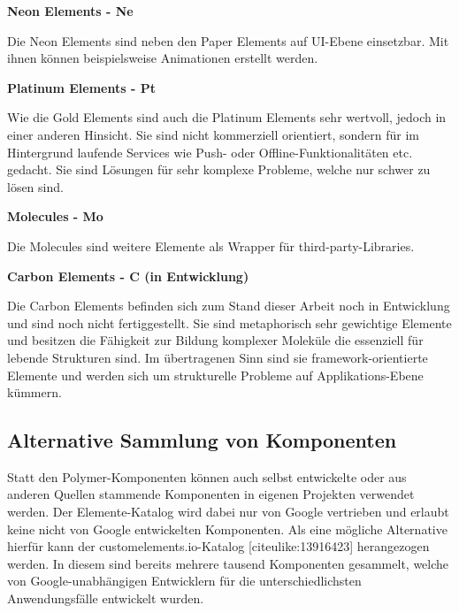 \textbf{Neon Elements - Ne}

Die Neon Elements sind neben den Paper Elements auf UI-Ebene einsetzbar.
Mit ihnen können beispielsweise Animationen erstellt werden.

\textbf{Platinum Elements - Pt}

Wie die Gold Elements sind auch die Platinum Elements sehr wertvoll,
jedoch in einer anderen Hinsicht. Sie sind nicht kommerziell orientiert,
sondern für im Hintergrund laufende Services wie Push- oder
Offline-Funktionalitäten etc. gedacht. Sie sind Lösungen für sehr
komplexe Probleme, welche nur schwer zu lösen sind.

\textbf{Molecules - Mo}

Die Molecules sind weitere Elemente als Wrapper für
third-party-Libraries.

\textbf{Carbon Elements - C (in Entwicklung)}

Die Carbon Elements befinden sich zum Stand dieser Arbeit noch in
Entwicklung und sind noch nicht fertiggestellt. Sie sind metaphorisch
sehr gewichtige Elemente und besitzen die Fähigkeit zur Bildung
komplexer Moleküle die essenziell für lebende Strukturen sind. Im
übertragenen Sinn sind sie framework-orientierte Elemente und werden
sich um strukturelle Probleme auf Applikations-Ebene kümmern.

\subsection{Alternative Sammlung von
Komponenten}\label{alternative-sammlung-von-komponenten}

Statt den Polymer-Komponenten können auch selbst entwickelte oder aus
anderen Quellen stammende Komponenten in eigenen Projekten verwendet
werden. Der Elemente-Katalog wird dabei nur von Google vertrieben und
erlaubt keine nicht von Google entwickelten Komponenten. Als eine
mögliche Alternative hierfür kann der customelements.io-Katalog
{[}citeulike:13916423{]} herangezogen werden. In diesem sind bereits
mehrere tausend Komponenten gesammelt, welche von Google-unabhängigen
Entwicklern für die unterschiedlichsten Anwendungsfälle entwickelt
wurden.
